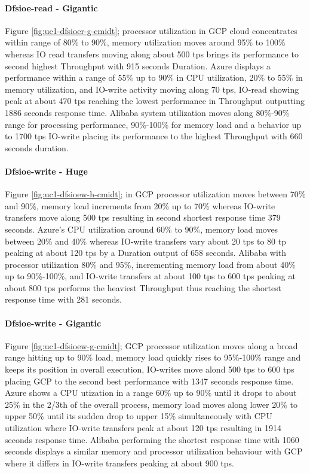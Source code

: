 \documentclass[review]{elsarticle}
\begin{document}
\paragraph{Dfsioe-read - Gigantic} Figure \ref{fig:uc1-dfsioer-g-cmidt}; processor utilization in GCP cloud concentrates within range of 80\% to 90\%, memory utilization moves around 95\% to 100\% whereas IO read transfers moving along about 500 tps brings its performance to second highest Throughput with 915 seconds Duration. Azure displays a performance within a range of 55\% up to 90\% in CPU utilization, 20\% to 55\% in memory utilization, and IO-write activity moving along 70 tps, IO-read showing peak at about 470 tps reaching the lowest performance in Throughput outputting 1886 seconds response time.
Alibaba system utilization moves along 80\%-90\% range for processing performance, 90\%-100\% for memory load and a behavior up to 1700 tps IO-write placing its performance to the highest Throughput with 660 seconds duration.

\paragraph{Dfsioe-write - Huge} Figure \ref{fig:uc1-dfsioew-h-cmidt}; in GCP processor utilization moves between 70\% and 90\%, memory load increments from 20\% up to 70\% whereas IO-write transfers move along 500 tps resulting in second shortest response time 379 seconds. Azure's CPU utilization around 60\% to 90\%, memory load moves between 20\% and 40\% whereas IO-write transfers vary about 20 tps to 80 tp peaking at about 120 tps by a Duration output of 658 seconds. Alibaba with processor utilization 80\% and 95\%, incrementing memory load from about 40\% up to 90\%-100\%, and IO-write transfers at about 100 tps to 600 tps peaking at about 800 tps performs the heaviest Throughput thus reaching the shortest response time with 281 seconds.

\paragraph{Dfsioe-write - Gigantic} Figure \ref{fig:uc1-dfsioew-g-cmidt}; GCP processor utilization moves along a broad range hitting up to 90\% load, memory load quickly rises to 95\%-100\% range and keeps its position in overall execution,  IO-writes move alond 500 tps to 600 tps placing GCP to the second best performance with 1347 seconds response time. Azure shows a CPU utization in a range 60\% up to 90\% until it drops to about 25\% in the 2/3th of the overall process, memory load moves along lower 20\% to upper 50\% until its sudden drop to upper 15\% simultaneously with CPU utilization where IO-write transfers peak at about 120 tps resulting in 1914 seconds response time. Alibaba performing the shortest response time with 1060 seconds displays a similar memory and processor utilization behaviour with GCP where it differs in IO-write transfers peaking at about 900 tps.
\end{document}

